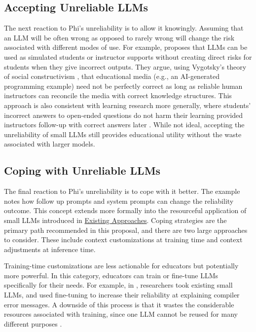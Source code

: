 \subsection{Accepting Unreliable LLMs}\label{accepting-unreliable-llms}

The next reaction to Phi's unreliability is to allow it knowingly. Assuming that an LLM will be often wrong as opposed to rarely wrong will change the risk associated with different modes of use. For example, \cite{falknerEffectiveUseLarge2026} proposes that LLMs can be used as simulated students or instructor supports without creating direct risks for students when they give incorrect outputs. They argue, using Vygotsky's theory of social constructivism \cite{vygotskyMindSocietyDevelopment1978a}, that educational media (e.g., an AI-generated programming example) need not be perfectly correct as long as reliable human instructors can reconcile the media with correct knowledge structures. This approach is also consistent with learning research more generally, where students' incorrect answers to open-ended questions do not harm their learning provided instructors follow-up with correct answers later \cite{langSmallTeachingEveryday2021}. While not ideal, accepting the unreliability of small LLMs still provides educational utility without the waste associated with larger models.

\subsection{Coping with Unreliable LLMs}\label{coping-with-unreliable-llms}

The final reaction to Phi's unreliability is to cope with it better. The example notes how follow up prompts and system prompts can change the reliability outcome. This concept extends more formally into the resourceful application of small LLMs introduced in \hyperref[existing-approaches]{Existing Approaches}. Coping strategies are the primary path recommended in this proposal, and there are two large approaches to consider. These include context customizations at training time and context adjustments at inference time.

Training-time customizations are less actionable for educators but potentially more powerful. In this category, educators can train or fine-tune LLMs specifically for their needs. For example, in \cite{solanoFineTuningOpenSourceModels2026}, researchers took existing small LLMs, and used fine-tuning to increase their reliability at explaining compiler error messages. A downside of this process is that it wastes the considerable resources associated with training, since one LLM cannot be reused for many different purposes \cite{renReconcilingContrastingNarratives2024,solanoFineTuningOpenSourceModels2026}.

